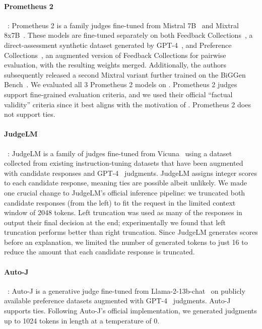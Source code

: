 \documentclass{article} %
\begin{document}
\paragraph{Prometheus 2}~\citep{kim2024prometheus2}: Prometheus 2 is a family judges fine-tuned from Mistral 7B~\citep{jiang2023mistral} and Mixtral 8x7B~\citep{jiang2024mixtralexperts}. These models are fine-tuned separately on both Feedback Collections~\citep{kim2023prometheus}, a direct-assessment synthetic dataset generated by GPT-4~\citep{openai2024gpt4technicalreport}, and Preference Collections~\citep{kim2024prometheus2}, an augmented version of Feedback Collections for pairwise evaluation, with the resulting weights merged. Additionally, the authors subsequently released a second Mixtral variant further trained on the BiGGen Bench~\citep{kim2024biggenbenchprincipledbenchmark}. We evaluated all 3
Prometheus 2 models on \sys. Prometheus 2 judges support fine-grained evaluation criteria, and we used their official ``factual validity'' criteria since it best aligns with the motivation of \sys. Prometheus 2 does not support ties.
\paragraph{JudgeLM}~\citep{zhu2023judgelm}: JudgeLM is a family of judges fine-tuned from Vicuna~\citep{vicuna2023} using a dataset collected from existing instruction-tuning datasets that have been augmented with candidate responses and GPT-4~\citep{openai2024gpt4technicalreport} judgments. JudgeLM assigns integer scores to each candidate response, meaning ties are possible albeit unlikely. We made one crucial change to JudgeLM's official inference pipeline: we truncated both candidate responses (from the left) to fit the request in the limited context window of 2048 tokens. Left truncation was used as many of the responses in \sys output their final decision at the end; experimentally we found that left truncation performs better than right truncation. Since JudgeLM generates scores before an explanation, we limited the number of generated tokens to just 16 to reduce the amount that each candidate response is truncated.
\paragraph{Auto-J}~\citep{li2023autoj}: Auto-J is a generative judge fine-tuned from Llama-2-13b-chat~\citep{touvron2023llama2} on publicly available preference datasets augmented with GPT-4~\citep{openai2024gpt4technicalreport} judgments. Auto-J supports ties. Following Auto-J's official implementation, we generated judgments up to 1024 tokens in length at a temperature of 0.
\end{document}
